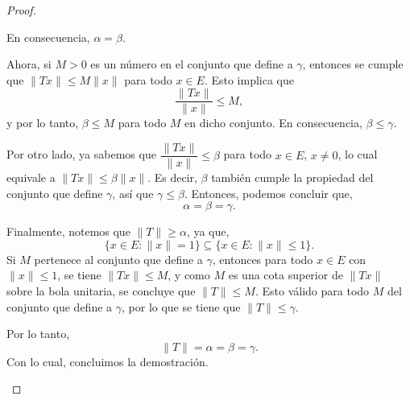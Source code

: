 \begin{proof}
\begin{enumerate}
En consecuencia, \(\alpha = \beta\).

Ahora, si \(M > 0\) es un número en el conjunto que define a \(\gamma\), entonces se cumple que \(\|Tx\| \leq M \|x\|\) para todo \(x \in E\). Esto implica que
\[
\frac{\|Tx\|}{\|x\|} \leq M,
\]
y por lo tanto, \(\beta \leq M\) para todo \(M\) en dicho conjunto. En consecuencia, \(\beta \leq \gamma\).

Por otro lado, ya sabemos que \(\dfrac{\|Tx\|}{\|x\|} \leq \beta\) para todo \(x \in E\), \(x \neq 0\), lo cual equivale a \(\|Tx\| \leq \beta \|x\|\). Es decir, \(\beta\) también cumple la propiedad del conjunto que define \(\gamma\), así que \(\gamma \leq \beta\). Entonces, podemos concluir que,
\[
\alpha = \beta = \gamma.
\]

Finalmente, notemos que \(\|T\| \geq \alpha\), ya que,
\[
\{x \in E : \|x\| = 1\} \subseteq \{x \in E : \|x\| \leq 1\}.
\]
Si \(M\) pertenece al conjunto que define a \(\gamma\), entonces para todo \(x \in E\) con \(\|x\| \leq 1\), se tiene \(\|Tx\| \leq M\), y como \(M\) es una cota superior de \(\|Tx\|\) sobre la bola unitaria, se concluye que \(\|T\| \leq M\). Esto válido para todo \(M\) del conjunto que define a \(\gamma\), por lo que se tiene que \(\|T\| \leq \gamma\).

Por lo tanto,
\[
\|T\| = \alpha = \beta = \gamma.
\]
Con lo cual, concluimos la demostración.


\end{enumerate}
    
    
\end{proof}
